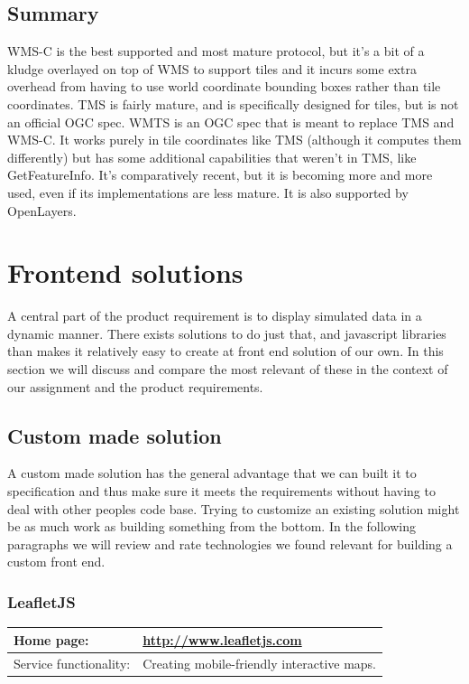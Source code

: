 \documentclass[11pt,a4paper,titlepage,oneside]{report}
\begin{document}
  \subsection{Summary}
    WMS-C is the best supported and most mature protocol, but it's a bit of a kludge overlayed on top of WMS to support tiles and it incurs some extra overhead from having to use world coordinate bounding boxes rather than tile coordinates.
    TMS is fairly mature, and is specifically designed for tiles, but is not an official OGC spec.
    WMTS is an OGC spec that is meant to replace TMS and WMS-C. It works purely in tile coordinates like TMS (although it computes them differently) but has some additional capabilities that weren't in TMS, like GetFeatureInfo. It's comparatively recent, but it is becoming more and more used, even if its implementations are less mature. It is also supported by OpenLayers.

\section{Frontend solutions}
  A central part of the product requirement is to display simulated data in a dynamic manner. There exists solutions to do just that, and javascript libraries than makes it relatively easy to create at front end solution of our own. In this section we will discuss and compare the most relevant of these in the context of our assignment and the product requirements. 
  \subsection{Custom made solution}
    A custom made solution has the general advantage that we can built it to specification and thus make sure it meets the requirements without having to deal with other peoples code base. Trying to customize an existing solution might be as much work as building something from the bottom. In the following paragraphs we will review and rate technologies we found relevant for building a custom front end.
    \subsubsection{LeafletJS}
    \begin{tabular}{|p{4cm}|p{8cm}|}
      \hline
      Home page: & \url{http://www.leafletjs.com} \\
      \hline
      Service functionality: & Creating mobile-friendly interactive maps. \\
      \hline
    \end{tabular}
    
\end{document}
